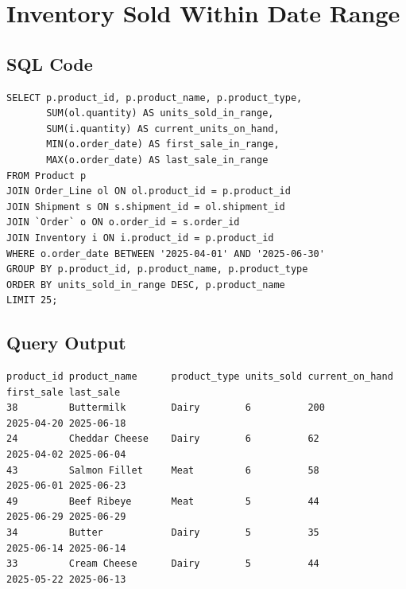 \section{Inventory Sold Within Date Range}

\subsection{SQL Code}
{\scriptsize
\begin{verbatim}
SELECT p.product_id, p.product_name, p.product_type,
       SUM(ol.quantity) AS units_sold_in_range,
       SUM(i.quantity) AS current_units_on_hand,
       MIN(o.order_date) AS first_sale_in_range,
       MAX(o.order_date) AS last_sale_in_range
FROM Product p
JOIN Order_Line ol ON ol.product_id = p.product_id
JOIN Shipment s ON s.shipment_id = ol.shipment_id
JOIN `Order` o ON o.order_id = s.order_id
JOIN Inventory i ON i.product_id = p.product_id
WHERE o.order_date BETWEEN '2025-04-01' AND '2025-06-30'
GROUP BY p.product_id, p.product_name, p.product_type
ORDER BY units_sold_in_range DESC, p.product_name
LIMIT 25;
\end{verbatim}
}

\subsection{Query Output}
{\scriptsize
\begin{verbatim}
product_id product_name      product_type units_sold current_on_hand first_sale last_sale
38         Buttermilk        Dairy        6          200             2025-04-20 2025-06-18
24         Cheddar Cheese    Dairy        6          62              2025-04-02 2025-06-04
43         Salmon Fillet     Meat         6          58              2025-06-01 2025-06-23
49         Beef Ribeye       Meat         5          44              2025-06-29 2025-06-29
34         Butter            Dairy        5          35              2025-06-14 2025-06-14
33         Cream Cheese      Dairy        5          44              2025-05-22 2025-06-13
\end{verbatim}
}
